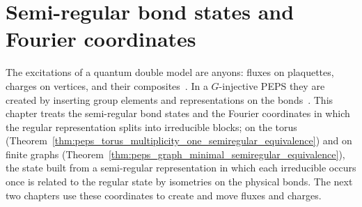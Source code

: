 \chapter{Semi-regular bond states and Fourier coordinates}
\label{ch:peps_anyons_bond_states}

The excitations of a quantum double model are anyons: fluxes on plaquettes,
charges on vertices, and their composites~\cite{Kitaev2003FaultTolerant}. In a
$G$-injective PEPS they are created by inserting group elements and
representations on the bonds~\cite[Section~III.B]{Cirac2021Matrix}. This
chapter treats the semi-regular bond states and the Fourier coordinates in
which the regular representation splits into irreducible blocks; on the torus
(Theorem~\ref{thm:peps_torus_multiplicity_one_semiregular_equivalence}) and on
finite graphs (Theorem~\ref{thm:peps_graph_minimal_semiregular_equivalence}),
the state built from a semi-regular representation in which each irreducible
occurs once is related to the regular state by isometries on the physical
bonds. The next two chapters use these coordinates
to create and move fluxes and charges.


